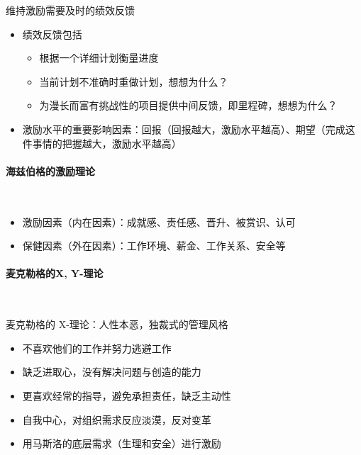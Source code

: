 维持激励需要及时的绩效反馈
\begin{itemize}
    \item 绩效反馈包括
    \vspace{-0.8em}
    \begin{multicols}{2}
        \begin{itemize}
            \item 根据一个详细计划衡量进度
            \item 当前计划不准确时重做计划，想想为什么？
            \item 为漫长而富有挑战性的项目提供中间反馈，即里程碑，想想为什么？
        \end{itemize}
    \end{multicols}
    \vspace{-1em}
    \item 激励水平的重要影响因素：回报（回报越大，激励水平越高）、期望（完成这件事情的把握越大，激励水平越高）
\end{itemize}

\paragraph{海兹伯格的激励理论}~{} \par
\begin{itemize}
    \item 激励因素（内在因素）：成就感、责任感、晋升、被赏识、认可
    \item 保健因素（外在因素）：工作环境、薪金、工作关系、安全等
\end{itemize}

\paragraph{麦克勒格的X, Y-理论}~{} \par
麦克勒格的 X-理论：人性本恶，独裁式的管理风格
\vspace{-0.8em}
\begin{multicols}{2}
    \begin{itemize}
        \item 不喜欢他们的工作并努力逃避工作
        \item 缺乏进取心，没有解决问题与创造的能力
        \item 更喜欢经常的指导，避免承担责任，缺乏主动性
        \item 自我中心，对组织需求反应淡漠，反对变革
        \item 用马斯洛的底层需求（生理和安全）进行激励
    \end{itemize}
\end{multicols}
\vspace{-1em}

